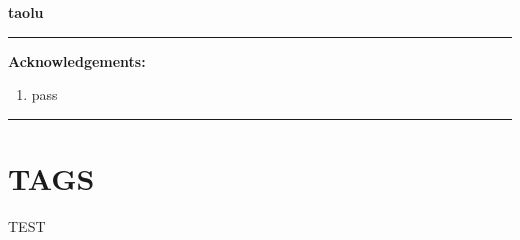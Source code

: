 \documentclass[11pt]{article}
\begin{document}
\begin{center}
	\textbf{taolu} \\
\par\end{center}

\noindent
\rule{\linewidth}{0.4pt}
{\bf {\large Acknowledgements:}}
\begin{enumerate} 
    \item pass
    \end{enumerate}
\rule{\linewidth}{0.4pt}

\newpage

\section{TAGS}
    TEST


\end{document}
